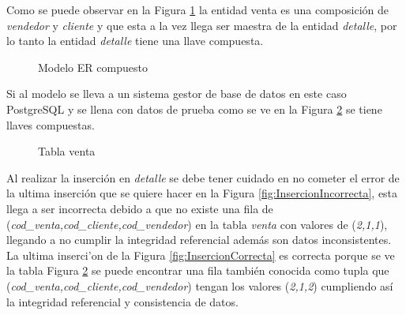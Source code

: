 Como se puede observar en la Figura \ref{fig:ModeloERcomp} la entidad venta es una composici\'on de \textit{vendedor} y \textit{cliente} y que esta a la vez llega ser maestra de la entidad \textit{detalle}, por lo tanto la entidad \textit{detalle} tiene una llave compuesta.
\begin{figure}[H]
\centering
{}
\caption{Modelo ER compuesto} \label{fig:ModeloERcomp}
\end{figure}
Si al modelo se lleva a un sistema gestor de base de datos en este caso PostgreSQL y se llena con datos de prueba como se ve en la Figura \ref{fig:tabla venta} se tiene  llaves compuestas.
\begin{figure}[H]
\centering
{}
\caption{Tabla venta} \label{fig:tabla venta}
\end{figure}

Al realizar la inserci\'on en \textit{detalle} se debe tener cuidado en no cometer el error de la ultima inserci\'on que se quiere hacer en la Figura \ref{fig:InsercionIncorrecta}, esta llega a ser incorrecta debido a que no existe una fila de (\textit{cod\_venta,cod\_cliente,cod\_vendedor}) en la tabla \textit{venta} con valores de (\textit{2,1,1}), llegando a no cumplir la integridad referencial adem\'as son datos inconsistentes. La ultima inserci'on de la Figura \ref{fig:InsercionCorrecta} es correcta porque se ve la tabla Figura \ref{fig:tabla venta} se puede encontrar una fila tambi\'en conocida como tupla que (\textit{cod\_venta,cod\_cliente,cod\_vendedor}) tengan los valores (\textit{2,1,2}) cumpliendo as\'i la integridad referencial y consistencia de datos.


